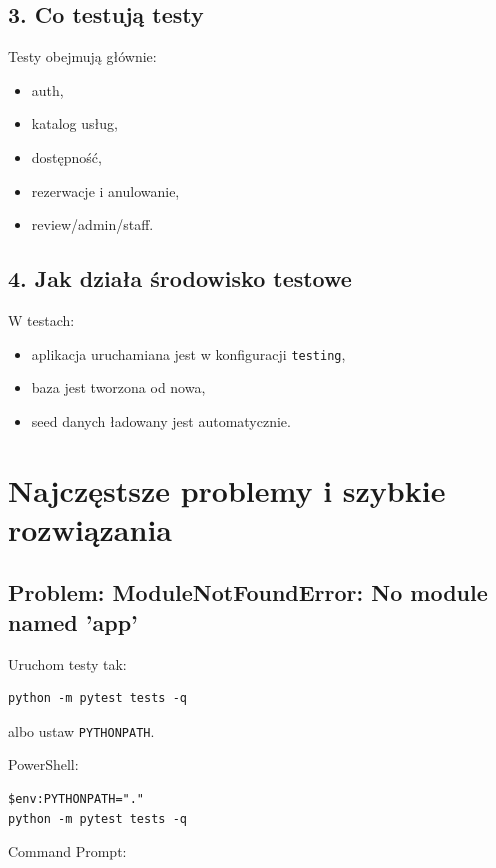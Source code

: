\documentclass[11pt,a4paper]{article}
\begin{document}
\subsection{3. Co testują testy}

Testy obejmują głównie:
\begin{itemize}[leftmargin=1.2cm]
    \item auth,
    \item katalog usług,
    \item dostępność,
    \item rezerwacje i anulowanie,
    \item review/admin/staff.
\end{itemize}

\subsection{4. Jak działa środowisko testowe}

W testach:
\begin{itemize}[leftmargin=1.2cm]
    \item aplikacja uruchamiana jest w konfiguracji \texttt{testing},
    \item baza jest tworzona od nowa,
    \item seed danych ładowany jest automatycznie.
\end{itemize}

\section{Najczęstsze problemy i szybkie rozwiązania}

\subsection{Problem: ModuleNotFoundError: No module named 'app'}

Uruchom testy tak:

\begin{lstlisting}
python -m pytest tests -q
\end{lstlisting}

albo ustaw \texttt{PYTHONPATH}.

PowerShell:

\begin{lstlisting}
$env:PYTHONPATH="."
python -m pytest tests -q
\end{lstlisting}

Command Prompt:
\end{document}
